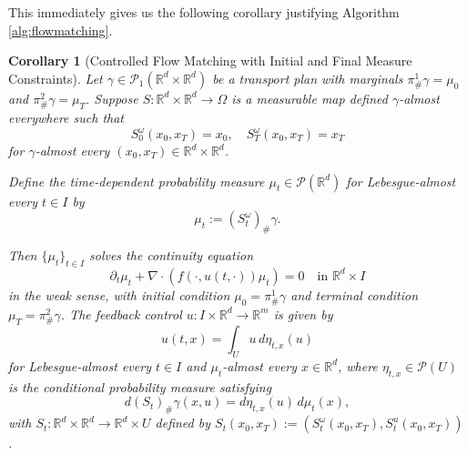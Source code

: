 \documentclass{article}
\newtheorem{corollary}[theorem]{Corollary}
\begin{document}
This immediately gives us the following corollary justifying Algorithm \ref{alg:flowmatching}.

\begin{corollary}[Controlled Flow Matching with Initial and Final Measure Constraints]
\label{cor:flow-matching}
Let $\gamma \in \mathcal{P}_1(\mathbb{R}^d \times \mathbb{R}^d)$ be a transport plan with marginals $\pi^1_{\#}\gamma = \mu_0$ and $\pi^2_{\#}\gamma = \mu_T$. Suppose $S: \mathbb{R}^d \times \mathbb{R}^d \rightarrow \Omega$ is a measurable map defined $\gamma$-almost everywhere such that 
\[S^{\omega}_0(x_0,x_T) = x_0, \quad S^{\omega}_T(x_0,x_T) = x_T\]
for $\gamma$-almost every $(x_0,x_T) \in \mathbb{R}^d \times \mathbb{R}^d$. 

Define the time-dependent probability measure $\mu_t \in \mathcal{P}(\mathbb{R}^d)$ for Lebesgue-almost every $t \in I$ by 
\[\mu_t := (S^{\omega}_t)_{\#}\gamma.\]

Then $\{\mu_t\}_{t \in I}$ solves the continuity equation 
\begin{equation}
\partial_t \mu_t + \nabla \cdot (f(\cdot, u(t,\cdot))\mu_t) = 0 \quad \text{in } \mathbb{R}^d \times I
\end{equation}
in the weak sense, with initial condition $\mu_0 = \pi^1_{\#}\gamma$ and terminal condition $\mu_T = \pi^2_{\#}\gamma$. The feedback control $u: I \times \mathbb{R}^d \rightarrow \mathbb{R}^m$ is given by
\[u(t,x) = \int_{U} u \, d\eta_{t,x}(u)\]
for Lebesgue-almost every $t \in I$ and $\mu_t$-almost every $x \in \mathbb{R}^d$, where $\eta_{t,x} \in \mathcal{P}(U)$ is the conditional probability measure satisfying
\[d(S_t)_{\#}\gamma(x,u) = d\eta_{t,x}(u) \, d\mu_t(x),\]
with $S_t: \mathbb{R}^d \times \mathbb{R}^d \rightarrow \mathbb{R}^d \times U$ defined by $S_t(x_0,x_T) := (S^{\omega}_t(x_0,x_T), S^u_t(x_0,x_T))$.
\end{corollary}

\end{document}
